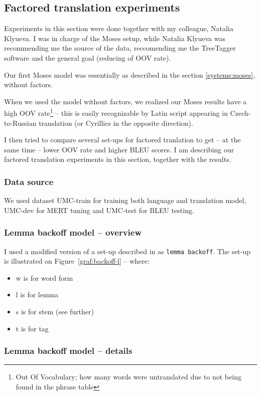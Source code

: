 \subsection{Factored translation experiments}
\label{experiments:factors}
Experiments in this section were done together with my colleague, Natalia Klyueva. I was in charge of the Moses setup, while Natalia 
Klyueva was recommending me the source of the data, 
reccomending me the TreeTagger software
and the general goal (reducing of OOV rate).

Our first Moses model was essentially as described in the section \ref{systems:moses}, without factors.

When we used the model without factors, we realized our Moses results have a high OOV rate\footnote{Out Of Vocabulary; how many words were untranslated due to not being found in the phrase table} -- this is easily recognizable by Latin script appearing in Czech-to-Russian translation (or Cyrillics in the opposite direction). 

I then tried to compare several set-ups for factored tranlation to get -- at the same time -- lower OOV rate and higher BLEU scores. I am describing our factored translation experiments in this section, together with the results.

\subsubsection{Data source}
We used dataset UMC-train for training both language and translation model, UMC-dev for MERT tuning and UMC-test for BLEU testing.

\subsubsection{Lemma backoff model -- overview}


I used a modified version of a set-up described in \cite{backoff} as \texttt{lemma backoff}. The set-up is illustrated on Figure~\ref{graf:backoff-l} -- where: 
\begin{itemize}
\item w is for word form
\item l is for lemma
\item s is for stem (see further)
\item t is for tag
\end{itemize}

\subsubsection{Lemma backoff model -- details}

